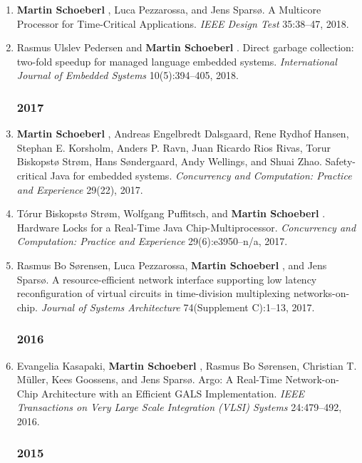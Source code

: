 \begin{enumerate}
\item {\bf Martin Schoeberl }, Luca Pezzarossa, and Jens Spars{\o}.
 A Multicore Processor for Time-Critical Applications.
 \emph{IEEE Design Test} 35:38--47, 2018.

\item Rasmus Ulslev Pedersen and {\bf Martin Schoeberl }.
 Direct garbage collection: two-fold speedup for managed language embedded systems.
 \emph{International Journal of Embedded Systems} 10(5):394--405, 2018.


\subsubsection*{2017}

\item {\bf Martin Schoeberl }, Andreas Engelbredt Dalsgaard, Rene Rydhof Hansen, Stephan E. Korsholm, Anders P. Ravn, Juan Ricardo Rios Rivas, Torur Biskopst{\o} Str{\o}m, Hans S{\o}ndergaard, Andy Wellings, and Shuai Zhao.
 Safety-critical Java for embedded systems.
 \emph{Concurrency and Computation: Practice and Experience} 29(22), 2017.

\item T{\'o}rur Biskopst{\o} Str{\o}m, Wolfgang Puffitsch, and {\bf Martin Schoeberl }.
 Hardware Locks for a Real-Time Java Chip-Multiprocessor.
 \emph{Concurrency and Computation: Practice and Experience} 29(6):e3950--n/a, 2017.

\item Rasmus Bo S{\o}rensen, Luca Pezzarossa, {\bf Martin Schoeberl }, and Jens Spars{\o}.
 A resource-efficient network interface supporting low latency reconfiguration of virtual circuits in time-division multiplexing networks-on-chip.
 \emph{Journal of Systems Architecture} 74(Supplement C):1--13, 2017.


\subsubsection*{2016}

\item Evangelia Kasapaki, {\bf Martin Schoeberl }, Rasmus Bo S{\o}rensen, Christian T. M\"uller, Kees Goossens, and Jens Spars{\o}.
 Argo: A Real-Time Network-on-Chip Architecture with an Efficient GALS Implementation.
 \emph{IEEE Transactions on Very Large Scale Integration (VLSI) Systems} 24:479--492, 2016.


\subsubsection*{2015}


\end{enumerate}
